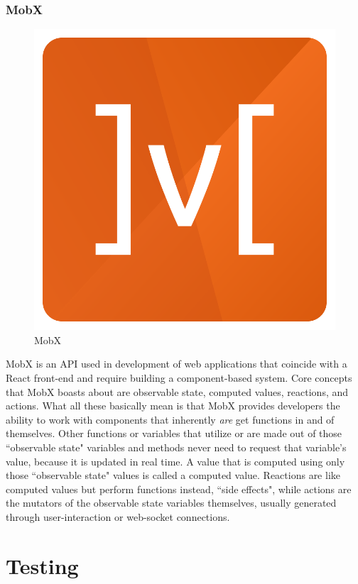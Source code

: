 \documentclass[12pt,a4paper]{report}
\begin{document}
			\subsubsection{MobX}
			\begin{figure}
				\includegraphics[scale=.17]{mobx}
				\caption{MobX}
				\label{fig: MobX}
			\end{figure}
			MobX is an API used in development of web applications that coincide with a React front-end and require building a component-based system. Core concepts that MobX boasts about are observable state, computed values, reactions, and actions. What all these basically mean is that MobX provides developers the ability to work with components that inherently \textit{are} get functions in and of themselves. Other functions or variables that utilize or are made out of those ``observable state" variables and methods never need to request that variable's value, because it is updated in real time. A value that is computed using only those ``observable state" values is called a computed value. Reactions are like computed values but perform functions instead, ``side effects", while actions are the mutators of the observable state variables themselves, usually generated through user-interaction or web-socket connections. \cite{mobx}
	\section{Testing}
\end{document}
